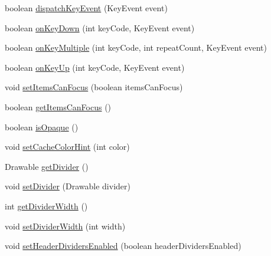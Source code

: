 \begin{DoxyCompactItemize}
\item 
boolean \hyperlink{classit_1_1sephiroth_1_1android_1_1library_1_1widget_1_1_h_list_view_a5f617100e4e25e8288f255a5dbc04cc3}{dispatch\+Key\+Event} (Key\+Event event)
\item 
boolean \hyperlink{classit_1_1sephiroth_1_1android_1_1library_1_1widget_1_1_h_list_view_acf610378dfc7d48aa469231caf19ffb1}{on\+Key\+Down} (int key\+Code, Key\+Event event)
\item 
boolean \hyperlink{classit_1_1sephiroth_1_1android_1_1library_1_1widget_1_1_h_list_view_a72ff3c8f1e2ce9f1f30b0990472718b7}{on\+Key\+Multiple} (int key\+Code, int repeat\+Count, Key\+Event event)
\item 
boolean \hyperlink{classit_1_1sephiroth_1_1android_1_1library_1_1widget_1_1_h_list_view_abda93054aa61eebfa6e7105596682350}{on\+Key\+Up} (int key\+Code, Key\+Event event)
\item 
void \hyperlink{classit_1_1sephiroth_1_1android_1_1library_1_1widget_1_1_h_list_view_a5fd04e41281d6551441c62a003684942}{set\+Items\+Can\+Focus} (boolean items\+Can\+Focus)
\item 
boolean \hyperlink{classit_1_1sephiroth_1_1android_1_1library_1_1widget_1_1_h_list_view_abf3ff9eb4fefcb4fd0db3160b92c3c7f}{get\+Items\+Can\+Focus} ()
\item 
boolean \hyperlink{classit_1_1sephiroth_1_1android_1_1library_1_1widget_1_1_h_list_view_a3ea264617fe9f8fa770a1d8fd06beca8}{is\+Opaque} ()
\item 
void \hyperlink{classit_1_1sephiroth_1_1android_1_1library_1_1widget_1_1_h_list_view_acc497071c313f5c7a6a661d3ffe1da42}{set\+Cache\+Color\+Hint} (int color)
\item 
Drawable \hyperlink{classit_1_1sephiroth_1_1android_1_1library_1_1widget_1_1_h_list_view_a37b13af27418111a802770df39f20f4d}{get\+Divider} ()
\item 
void \hyperlink{classit_1_1sephiroth_1_1android_1_1library_1_1widget_1_1_h_list_view_a2a289047ef4485a4bed758c2bc3d0859}{set\+Divider} (Drawable divider)
\item 
int \hyperlink{classit_1_1sephiroth_1_1android_1_1library_1_1widget_1_1_h_list_view_abdfb8bbcc37c4748105026d76569f35b}{get\+Divider\+Width} ()
\item 
void \hyperlink{classit_1_1sephiroth_1_1android_1_1library_1_1widget_1_1_h_list_view_af8b514a0bddf2dcec7696aadc301de99}{set\+Divider\+Width} (int width)
\item 
void \hyperlink{classit_1_1sephiroth_1_1android_1_1library_1_1widget_1_1_h_list_view_a1e1dfcddc904321ca76f03224c68829a}{set\+Header\+Dividers\+Enabled} (boolean header\+Dividers\+Enabled)

\end{DoxyCompactItemize}
